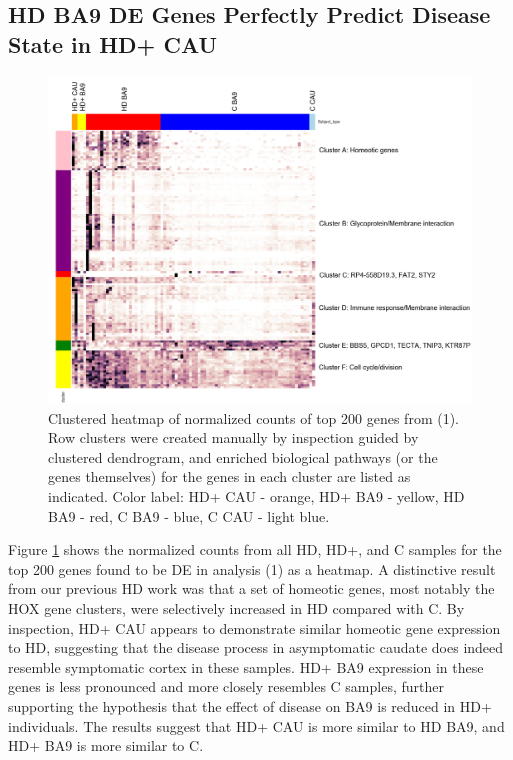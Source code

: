\documentclass[fleqn,10pt,table]{wlscirep}
\newcommand{\attn}[1]{\colorbox{red}{#1}}
\newcommand{\todo}[1]{\colorbox{yellow}{#1}}
\begin{document}
\subsection{HD BA9 DE Genes Perfectly Predict Disease State in HD+ CAU}
\begin{figure}
\centering
\includegraphics[width=0.7\linewidth]{heatmap.png}
\caption{Clustered heatmap of normalized counts of top 200 genes from (1). Row clusters were created manually by inspection guided by clustered dendrogram, and enriched  biological pathways (or the genes themselves) for the genes in each cluster are listed as indicated. Color label: HD+ CAU - orange, HD+ BA9 - yellow, HD BA9 - red, C BA9 - blue, C CAU - light blue. \label{fig:de_gene_heatmap}}
\end{figure}

Figure \ref{fig:de_gene_heatmap} shows the normalized counts from all HD, HD+, and C samples for the top 200 genes found to be DE in analysis (1) as a heatmap.
A distinctive result from our previous HD work \cite{Labadorf2017-qb} was that a set of homeotic genes, most notably the HOX gene clusters, were selectively increased in HD compared with C.
By inspection, HD+ CAU appears to demonstrate similar homeotic gene expression to HD, suggesting that the disease process in asymptomatic caudate does indeed resemble symptomatic cortex in these samples.
HD+ BA9 expression in these genes is less pronounced and more closely resembles C samples, further supporting the hypothesis that the effect of disease on BA9 is reduced in HD+ individuals.
The results suggest that HD+ CAU is more similar to HD BA9, and HD+ BA9 is more similar to C.
\end{document}
